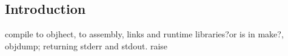 
\subsection{Introduction}

compile to objhect, to assembly, links and runtime libraries?or is in make?, objdump; returning stderr and stdout. raise